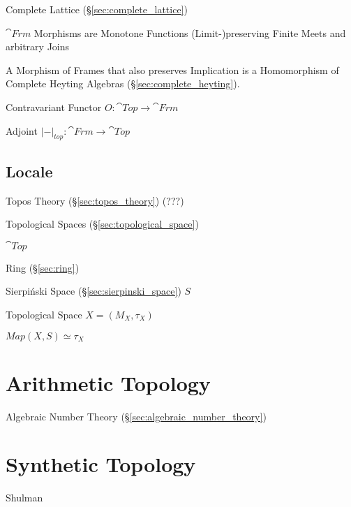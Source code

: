 Complete Lattice (\S\ref{sec:complete_lattice})

$\cat{Frm}$ Morphisms are Monotone Functions (Limit-)preserving Finite
Meets and arbitrary Joins

A Morphism of Frames that also preserves Implication is a Homomorphism
of Complete Heyting Algebras (\S\ref{sec:complete_heyting}).

Contravariant Functor $O : \cat{Top} \rightarrow \cat{Frm}$

Adjoint $|-|_{top} : \cat{Frm} \rightarrow \cat{Top}$ %



\subsection{Locale}\label{sec:locale}

Topos Theory (\S\ref{sec:topos_theory}) (???)

Topological Spaces (\S\ref{sec:topological_space})

$\cat{Top}$

Ring (\S\ref{sec:ring})

Sierpi\'nski Space (\S\ref{sec:sierpinski_space}) $S$

Topological Space $X = (M_X,\tau_X)$

$Map(X,S) \simeq \tau_X$



\section{Arithmetic Topology}\label{sec:arithmetic_topology}

Algebraic Number Theory (\S\ref{sec:algebraic_number_theory})



\section{Synthetic Topology}\label{sec:synthetic_topology}

\fist Shulman
